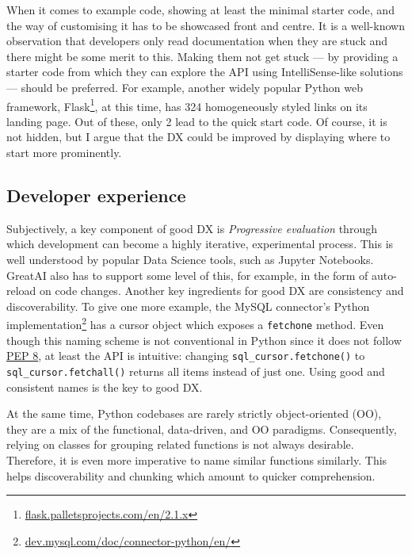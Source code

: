 When it comes to example code, showing at least the minimal starter code, and the way of customising it has to be showcased front and centre. It is a well-known observation that developers only read documentation when they are stuck and there might be some merit to this. Making them not get stuck --- by providing a starter code from which they can explore the API using IntelliSense-like solutions --- should be preferred. For example, another widely popular Python web framework, Flask\footnote{\href{https://flask.palletsprojects.com/en/2.1.x/}{flask.palletsprojects.com/en/2.1.x}}, at this time, has 324 homogeneously styled links on its landing page. Out of these, only 2 lead to the quick start code. Of course, it is not hidden, but I argue that the DX could be improved by displaying where to start more prominently.

\subsection{Developer experience}

Subjectively, a key component of good DX is \textit{Progressive evaluation} through which development can become a highly iterative, experimental process. This is well understood by popular Data Science tools, such as Jupyter Notebooks. GreatAI also has to support some level of this, for example, in the form of auto-reload on code changes. Another key ingredients for good DX are consistency and discoverability. To give one more example, the MySQL connector's Python implementation\footnote{\href{https://dev.mysql.com/doc/connector-python/en/}{dev.mysql.com/doc/connector-python/en/}} has a cursor object which exposes a \texttt{fetchone} method. Even though this naming scheme is not conventional in Python since it does not follow \href{https://peps.python.org/pep-0008/}{PEP 8}, at least the API is intuitive: changing \texttt{sql\_cursor.fetchone()} to \texttt{sql\_cursor.fetchall()} returns all items instead of just one. Using good and consistent names is the key to good DX.

At the same time, Python codebases are rarely strictly object-oriented (OO), they are a mix of the functional, data-driven, and OO paradigms. Consequently, relying on classes for grouping related functions is not always desirable. Therefore, it is even more imperative to name similar functions similarly. This helps discoverability and chunking \cite{hermans2021programmer} which amount to quicker comprehension.

